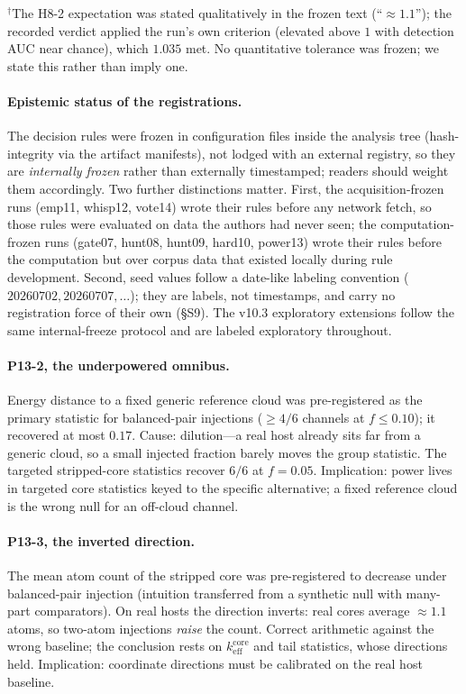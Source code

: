 \documentclass[12pt]{article}
\newcommand{\keff}{k_{\mathrm{eff}}}
\begin{document}
\begin{table}[t]
{\footnotesize $^{\dagger}$The H8-2 expectation was stated qualitatively in
the frozen text (``$\approx 1.1$''); the recorded verdict applied the run's
own criterion (elevated above $1$ with detection AUC near chance), which
$1.035$ met. No quantitative tolerance was frozen; we state this rather than
imply one.}
\end{table}

\paragraph{Epistemic status of the registrations.} The decision rules were
frozen in configuration files inside the analysis tree (hash-integrity via
the artifact manifests), not lodged with an external registry, so they are
\emph{internally frozen} rather than externally timestamped; readers should
weight them accordingly. Two further distinctions matter. First, the
acquisition-frozen runs (emp11, whisp12, vote14) wrote their rules before
any network fetch, so those rules were evaluated on data the authors had
never seen; the computation-frozen runs (gate07, hunt08, hunt09, hard10,
power13) wrote their rules before the computation but over corpus data that
existed locally during rule development. Second, seed values follow a
date-like labeling convention ($20260702, 20260707, \dots$); they are
labels, not timestamps, and carry no registration force of their own
(\S S9). The v10.3 exploratory extensions follow the same
internal-freeze protocol and are labeled exploratory throughout.

\paragraph{P13-2, the underpowered omnibus.}
Energy distance to a fixed generic reference cloud was pre-registered as the
primary statistic for balanced-pair injections ($\ge 4/6$ channels at
$f \le 0.10$); it recovered at most $0.17$. Cause: dilution---a real host
already sits far from a generic cloud, so a small injected fraction barely
moves the group statistic. The targeted stripped-core statistics recover
$6/6$ at $f = 0.05$. Implication: power lives in targeted core statistics
keyed to the specific alternative; a fixed reference cloud is the wrong null
for an off-cloud channel.

\paragraph{P13-3, the inverted direction.}
The mean atom count of the stripped core was pre-registered to decrease under
balanced-pair injection (intuition transferred from a synthetic null with
many-part comparators). On real hosts the direction inverts: real cores
average ${\approx}1.1$ atoms, so two-atom injections \emph{raise} the count.
Correct arithmetic against the wrong baseline; the conclusion rests on
$\keff^{\mathrm{core}}$ and tail statistics, whose directions held.
Implication: coordinate directions must be calibrated on the real host
baseline.
\end{document}

